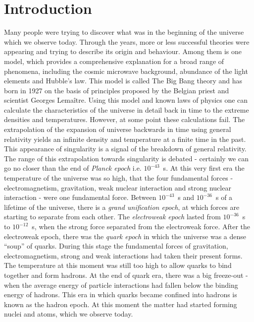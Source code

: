 \chapter*{Introduction}
Many people were trying to discover what was in the beginning of the universe which we observe today.
Through the years, more or less successful theories were appearing and trying to describe its origin and behaviour.
Among them is one model, which provides a comprehensive explanation for a broad range of phenomena, including the cosmic microwave background, abundance of the light elements and Hubble's law.
This model is called The Big Bang theory and has born in 1927 on the basis of principles proposed by the Belgian priest and scientist Georges Lema{\^i}tre.
Using this model and known laws of physics one can calculate the characteristics of the universe in detail back in time to the extreme densities and temperatures.
However, at some point these calculations fail.
The extrapolation of the expansion of universe backwards in time using general relativity yields an infinite density and temperature at a finite time in the past.
This appearance of singularity is a signal of the breakdown of general relativity.
The range of this extrapolation towards singularity is debated - certainly we can go no closer than the end of \textit{Planck epoch} i.e. $10^{-43}$~s.
At this very first era the temperature of the universe was so high, that the four fundamental forces - electromagnetism, gravitation, weak nuclear interaction and strong nuclear interaction - were one fundamental force.
Between $10^{-43}$~s and $10^{-36}$~s of a lifetime of the universe, there is a \textit{grand unification epoch}, at which forces are starting to separate from each other.
The \textit{electroweak epoch} lasted from $10^{-36}$~s to $10^{-12}$~s, when the strong force separated from the electroweak force.
After the electroweak epoch, there was the \textit{quark epoch} in which the universe was a dense ``soup'' of quarks.
During this stage the fundamental forces of gravitation, electromagnetism, strong and weak interactions had taken their present forms. 
The temperature at this moment was still too high to allow quarks to bind together and form hadrons.
At the end of quark era, there was a big freeze-out - when the average energy of particle interactions had fallen below the binding energy of hadrons.
This era in which quarks became confined into hadrons is known as the hadron epoch.
At this moment the matter had started forming nuclei and atoms, which we observe today.

